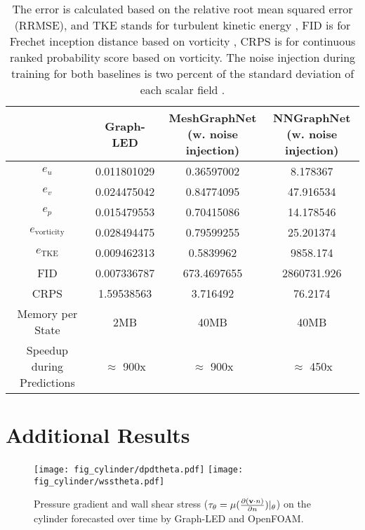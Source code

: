 \documentclass{article}
\begin{document}
{\begin{table}[htp]
    \centering
    \begin{center}
    \begin{tabular}{ |c|c|c|c| } 
     \hline
           & Graph-LED & \makecell{MeshGraphNet \\ (w. noise injection)} & \makecell{NNGraphNet \\ (w. noise injection)}\\
           \hline
     $e_u$ & 0.011801029& 0.36597002& 8.178367\\
     \hline
     $e_v$ & 0.024475042& 0.84774095& 47.916534\\ 
     \hline
     $e_p$ & 0.015479553& 0.70415086& 14.178546\\ 
     \hline
     $e_\mathrm{vorticity}$ & 0.028494475 & 0.79599255 & 25.201374\\ 
     \hline
     $e_\mathrm{TKE}$ & 0.009462313 & 0.5839962 & 9858.174\\ 
     \hline
     FID & 0.007336787& 673.4697655& 2860731.926\\ 
     \hline
     CRPS & 1.59538563& 3.716492& 76.2174\\ 
     \hline
     Memory per State & 2MB& 40MB& 40MB\\
     \hline
     Speedup during Predictions & $\approx$ 900x & $\approx$ 900x & $\approx$ 450x\\ 
     \hline
    \end{tabular}
    \end{center}
    \caption{ The error is calculated based on the relative root mean squared error (RRMSE), and TKE stands for turbulent kinetic energy \cite{pope2001turbulent}, FID is for Frechet inception distance based on vorticity \cite{jayasumana2024rethinking}, CRPS \cite{hersbach2000decomposition} is for continuous ranked probability score based on vorticity. The noise injection during training for both baselines is two percent of the standard deviation of each scalar field \cite{pfaff2020learning}.}
    \label{tab:my_label}
\end{table}
}

\newpage
\section{Additional Results}
\label{sec:addres}

\begin{figure}[htp]
    \centering
    \texttt{[image: fig\_cylinder/dpdtheta.pdf]}
    \texttt{[image: fig\_cylinder/wsstheta.pdf]}
    \caption{Pressure gradient and wall shear stress ($\tau_\theta = \mu(\frac{\partial (\mathbf{v}\cdot n)}{\partial n})|_\theta$) on the cylinder forecasted over time by Graph-LED and OpenFOAM.}
    \label{fig:fpc-dpdthetawss}
\end{figure}
\end{document}

